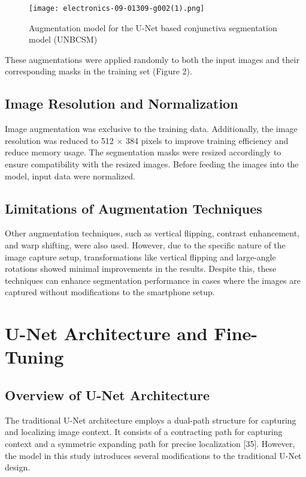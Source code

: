 \documentclass[conference]{IEEEtran}
\begin{document}
\begin{figure}[htbp]
\centerline{\texttt{[image: electronics-09-01309-g002(1).png]}}
\caption{Augmentation model for the U-Net based conjunctiva segmentation model (UNBCSM)}
\label{fig}
\end{figure}

These augmentations were applied randomly to both the input images and their corresponding masks in the training set (Figure 2). 

\subsection{\textbf{Image Resolution and Normalization}}
Image augmentation was exclusive to the training data. Additionally, the image resolution was reduced to 512 × 384 pixels to improve training efficiency and reduce memory usage. The segmentation masks were resized accordingly to ensure compatibility with the resized images. Before feeding the images into the model, input data were normalized. 

\subsection{\textbf{Limitations of Augmentation Techniques}}
Other augmentation techniques, such as vertical flipping, contrast enhancement, and warp shifting, were also used. However, due to the specific nature of the image capture setup, transformations like vertical flipping and large-angle rotations showed minimal improvements in the results. Despite this, these techniques can enhance segmentation performance in cases where the images are captured without modifications to the smartphone setup.

\section{\textbf{U-Net Architecture and Fine-Tuning}}

\subsection{\textbf{Overview of U-Net Architecture}}
The traditional U-Net architecture employs a dual-path structure for capturing and localizing image context. It consists of a contracting path for capturing context and a symmetric expanding path for precise localization [35]. However, the model in this study introduces several modifications to the traditional U-Net design.
\end{document}
